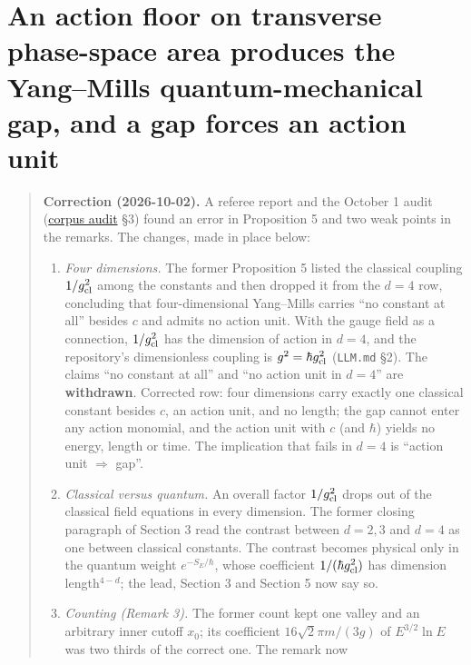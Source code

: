 \documentclass[11pt,a4paper]{article}
\newcommand{\tightlist}{\setlength{\itemsep}{0pt}\setlength{\parskip}{0pt}}
\begin{document}
\section{An action floor on transverse phase-space area produces the
Yang--Mills quantum-mechanical gap, and a gap forces an action
unit}\label{an-action-floor-on-transverse-phase-space-area-produces-the-yangmills-quantum-mechanical-gap-and-a-gap-forces-an-action-unit}

\begin{quote}
\textbf{Correction (2026-10-02).} A referee report and the October 1
audit (\href{corpus-audit-2026-10-01.md}{corpus audit} §3) found an
error in Proposition 5 and two weak points in the remarks. The changes,
made in place below:

\begin{enumerate}
\def\labelenumi{\arabic{enumi}.}
\tightlist
\item
  \emph{Four dimensions.} The former Proposition 5 listed the classical
  coupling \(1/g_{\rm cl}^2\) among the constants and then dropped it
  from the \(d=4\) row, concluding that four-dimensional Yang--Mills
  carries ``no constant at all'' besides \(c\) and admits no action
  unit. With the gauge field as a connection, \(1/g_{\rm cl}^2\) has the
  dimension of action in \(d=4\), and the repository's dimensionless
  coupling is \(g^2=\hbar g_{\rm cl}^2\) (\texttt{LLM.md} §2). The
  claims ``no constant at all'' and ``no action unit in \(d=4\)'' are
  \textbf{withdrawn}. Corrected row: four dimensions carry exactly one
  classical constant besides \(c\), an action unit, and no length; the
  gap cannot enter any action monomial, and the action unit with \(c\)
  (and \(\hbar\)) yields no energy, length or time. The implication that
  fails in \(d=4\) is ``action unit \(\Rightarrow\) gap''.
\item
  \emph{Classical versus quantum.} An overall factor \(1/g_{\rm cl}^2\)
  drops out of the classical field equations in every dimension. The
  former closing paragraph of Section 3 read the contrast between
  \(d=2,3\) and \(d=4\) as one between classical constants. The contrast
  becomes physical only in the quantum weight \(e^{-S_E/\hbar}\), whose
  coefficient \(1/(\hbar g_{\rm cl}^2)\) has dimension length\(^{4-d}\);
  the lead, Section 3 and Section 5 now say so.
\item
  \emph{Counting (Remark 3).} The former count kept one valley and an
  arbitrary inner cutoff \(x_0\); its coefficient \(16\sqrt2\pi m/(3g)\)
  of \(E^{3/2}\ln E\) was two thirds of the correct one. The remark now

\end{enumerate}
\end{quote}
\end{document}
